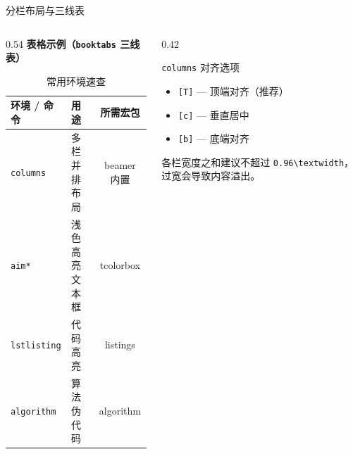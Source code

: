 \documentclass[aspectratio=169]{beamer}
\def\env#1{\texttt{\color{blue}\footnotesize #1}}
\begin{document}
\begin{frame}{分栏布局与三线表}
\begin{columns}[T]
\begin{column}{0.54\textwidth}
\textbf{表格示例（\texttt{booktabs} 三线表）}
\medskip
\begin{table}
\centering
\caption{常用环境速查}
\begin{tabular}{llc}
\toprule
\textbf{环境 / 命令} & \textbf{用途} & \textbf{所需宏包} \\
\midrule
\env{columns}    & 多栏并排布局   & beamer 内置 \\
\env{aim*}       & 浅色高亮文本框 & tcolorbox   \\
\env{lstlisting} & 代码高亮       & listings    \\
\env{algorithm}  & 算法伪代码     & algorithm   \\
\bottomrule
\end{tabular}
\end{table}
\end{column}
\begin{column}{0.42\textwidth}
\begin{aim*}{\texttt{columns} 对齐选项}{}
\begin{itemize}[left=0pt,label=\textcolor{deepblue}{}]
    \item \texttt{[T]} — 顶端对齐（推荐）
    \item \texttt{[c]} — 垂直居中
    \item \texttt{[b]} — 底端对齐
\end{itemize}
\medskip
各栏宽度之和建议不超过 \texttt{0.96\textbackslash textwidth}，过宽会导致内容溢出。
\end{aim*}
\end{column}
\end{columns}
\end{frame}
\end{document}
